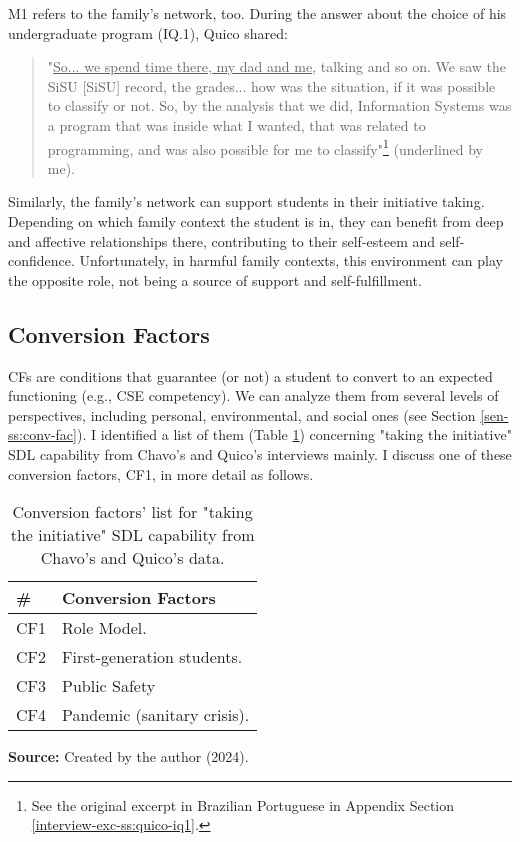 \gls{M}1 refers to the family's network, too. During the answer about the choice of his undergraduate program (\gls{IQ}.1), Quico shared:
\begin{quote}
    "\underline{So... we spend time there, my dad and me}, talking and so on. We saw the \acrshort{SiSU} [\acrlong{SiSU}] record, the grades... how was the situation, if it was possible to classify or not. So, by the analysis that we did, Information Systems was a program that was inside what I wanted, that was related to programming, and was also possible for me to classify"\footnote{See the original excerpt in Brazilian Portuguese in Appendix Section \ref{interview-exc-ss:quico-iq1}.} (underlined by me).
\end{quote}
Similarly, the family's network can support students in their initiative taking. Depending on which family context the student is in, they can benefit from deep and affective relationships there, contributing to their self-esteem and self-confidence. Unfortunately, in harmful family contexts, this environment can play the opposite role, not being a source of support and self-fulfillment.

\subsection{Conversion Factors}
\label{disc-ss:conversion-factors}

\glspl{CF} are conditions that guarantee (or not) a student to convert  to an expected functioning (e.g., \gls{CSE} competency). We can analyze them from several levels of perspectives, including personal, environmental, and social ones (see Section \ref{sen-ss:conv-fac}). I identified a list of them (Table \ref{tbl:conv-fac-list}) concerning "taking the initiative" \gls{SDL} capability from Chavo's and Quico's interviews mainly. I discuss one of these conversion factors, \gls{CF}1, in more detail as follows.

\begin{table}[ht]
\caption{Conversion factors' list for "taking the initiative" \acrshort{SDL} capability from Chavo's and Quico's data.}
\label{tbl:conv-fac-list}
\centering
{}
\begin{tabular}{p{0.8cm}p{5.5cm}}
\hline
\textbf{\#} &
\textbf{Conversion Factors}\\
\hline     
CF1 &
Role Model.\\
CF2 & 
First-generation students. \\
CF3 &
Public Safety \\
CF4 &
Pandemic (sanitary crisis).\\
\hline

\end{tabular}
\par\medskip\ABNTEXfontereduzida\selectfont\textbf{Source:} Created by the author (2024). \par\medskip
\end{table}

